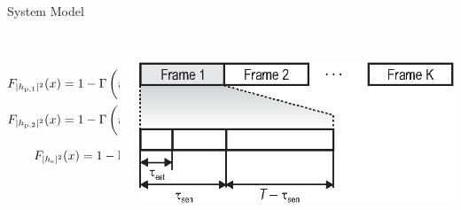 \documentclass[12pt]{beamer}
\begin{document}
\begin{frame}{System Model}
\begin{columns}[t]
\begin{column}{0.49 \paperwidth}
\begin{center}
                \end{center}
                \end{column}
        \end{columns}
        \begin{columns}[t]
                \begin{column}{0.51 \paperwidth}
		\begin{center}
			 \\[-0.4cm] 
			\begin{align*}
				F_{|h_{\text{p,1}}|^2}(x) = 1 - \Gamma\left(m_{\text{p,1}}, \frac{m_{\text{p,1}} x}{|\bar{h}_{\text{p,1}}|^2}\right) \\  
				F_{|h_{\text{p,2}}|^2}(x) = 1 - \Gamma\left(m_{\text{p,2}}, \frac{m_{\text{p,2}} x}{|\bar{h}_{\text{p,2}}|^2}\right) \\
				F_{|h_{\text{s}}|^2}(x) = 1 - \Gamma\left(m_{\text{s}} , \frac{m_{\text{s}} x}{|\bar{h}_{\text{s}}|^2}\right) 
			\end{align*}
                \end{center}
                \end{column}
                \begin{column}{0.49 \paperwidth}
                \begin{center}
		 \\[0.3cm]
                        \includegraphics[width = 0.38 \paperwidth]{../figures/Frame_Structure_grau}
                \end{center}
                \end{column}
        \end{columns}
\end{frame}
\end{document}
